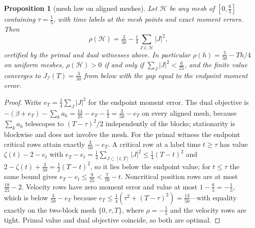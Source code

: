 \documentclass[11pt,a4paper]{article}
\theoremstyle{plain}
\newtheorem{proposition}[theorem]{Proposition}
\theoremstyle{definition}
\theoremstyle{remark}
\newcommand{\calI}{\mathcal{I}}
\newcommand{\calH}{\mathcal{H}}
\newcommand{\J}{J_{\calI}(T)}
\newcommand{\tfr}[2]{\tfrac{#1}{#2}}
\begin{document}
\begin{proposition}[mesh law on aligned meshes]\label{prop:meshlaw}
Let $\calH$ be any mesh of $[0,\tfr65]$ containing $\tau=\tfr15$, with time labels at the mesh points and exact moment errors. Then
\begin{equation}\label{eq:meshlaw}
\rho(\calH)=\tfr3{50}-\tfr14\sum_{J\in\calH}|J|^2 ,
\end{equation}
certified by the primal and dual witnesses above. In particular $\rho(h)=\tfr3{50}-Th/4$ on uniform meshes, $\rho(\calH)>0$ if and only if $\sum_J|J|^2<\tfr6{25}$, and the finite value converges to $\J=\tfr3{50}$ from below with the gap equal to the endpoint moment error.
\end{proposition}

\begin{proof}
Write $e_T=\tfr14\sum_J|J|^2$ for the endpoint moment error. The dual objective is $-(\beta+e_T)-\sum_ka_k=\tfr{14}{25}-e_T-\tfr12=\tfr3{50}-e_T$ on every aligned mesh, because $\sum_ka_k$ telescopes to $(T-\tau)^2/2$ independently of the blocks; stationarity is blockwise and does not involve the mesh. For the primal witness the endpoint critical rows attain exactly $\tfr3{50}-e_T$. A critical row at a label time $t\ge\tau$ has value $\zeta(t)-2-e_t$ with $e_T-e_t=\tfr14\sum_{J\subset[t,T]}|J|^2\le\tfr14(T-t)^2$ and $2-\zeta(t)+\tfr3{50}=\tfr12(T-t)^2$, so it lies below the endpoint value; for $t\le\tau$ the same bound gives $e_T-e_t\le\tfr9{25}<\tfr7{10}-t$. Noncritical position rows are at most $\tfr{18}{25}-2$. Velocity rows have zero moment error and value at most $1-\tfr65=-\tfr15$, which is below $\tfr3{50}-e_T$ because $e_T\le\tfr14(\tau^2+(T-\tau)^2)=\tfr{13}{50}$---with equality exactly on the two-block mesh $\{0,\tau,T\}$, where $\rho=-\tfr15$ and the velocity rows are tight. Primal value and dual objective coincide, so both are optimal.
\end{proof}
\end{document}
